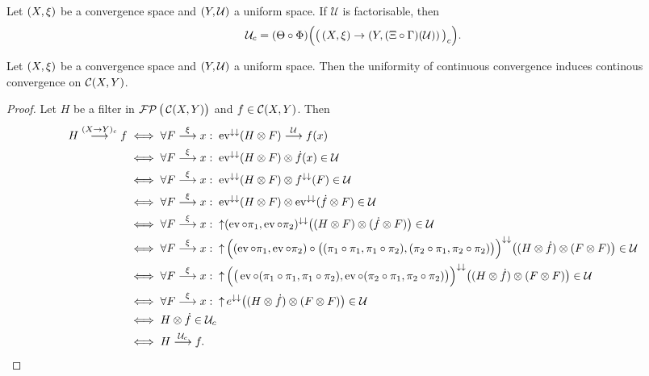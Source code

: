 \begin{lemma}
Let $\left( X, \xi \right)$ be a convergence space and $\left( Y, \mathcal{U} \right)$ a uniform space. If $\mathcal{U}$ is factorisable, then
\[ \mathcal{U}_c = (\Theta\circ\Phi)\Big(\big(\left( X,\xi \right) \to \left( Y, (\Xi\circ\Gamma)(\mathcal{U}) \right)\big)_c\Big). \]
\end{lemma}

\begin{lemma}
Let $\left( X, \xi \right)$ be a convergence space and $\left( Y, \mathcal{U} \right)$ a uniform space. Then the uniformity of continuous convergence induces continous convergence on $\operatorname{\mathcal{C}}(X,Y)$.
\end{lemma}
\begin{proof}
Let $H$ be a filter in $\operatorname{\mathcal{FP}}\big(\operatorname{\mathcal{C}}(X,Y)\big)$ and $f\in \operatorname{\mathcal{C}}(X, Y)$. Then
\begin{align*}
H\overset{(X\to Y)_c}{\longrightarrow} f &\iff \forall F\overset{\xi}{\longrightarrow}x: \; \operatorname{ev}^{\downarrow\downarrow}(H\otimes F) \overset{\mathcal{U}}{\longrightarrow} f(x) \\
&\iff \forall F\overset{\xi}{\longrightarrow}x: \; \operatorname{ev}^{\downarrow\downarrow}(H\otimes F)\otimes \dot{f}(x) \in\mathcal{U} \\
&\iff \forall F\overset{\xi}{\longrightarrow}x: \; \operatorname{ev}^{\downarrow\downarrow}(H\otimes F)\otimes f^{\downarrow\downarrow}(F) \in\mathcal{U} \\
&\iff \forall F\overset{\xi}{\longrightarrow}x: \; \operatorname{ev}^{\downarrow\downarrow}(H\otimes F)\otimes \operatorname{ev}^{\downarrow\downarrow}(\dot{f}\otimes F) \in\mathcal{U} \\
&\iff \forall F\overset{\xi}{\longrightarrow}x: \; \operatorname{\uparrow}(\operatorname{ev}\circ \pi_1, \operatorname{ev}\circ\pi_2)^{\downarrow\downarrow}\big((H\otimes F)\otimes(\dot{f}\otimes F)\big) \in\mathcal{U} \\
&\iff \forall F\overset{\xi}{\longrightarrow}x: \; \operatorname{\uparrow}\Big((\operatorname{ev}\circ \pi_1, \operatorname{ev}\circ\pi_2)\circ \big((\pi_1\circ\pi_1, \pi_1\circ\pi_2),(\pi_2\circ\pi_1, \pi_2\circ\pi_2)\big)\Big)^{\downarrow\downarrow}\big((H\otimes \dot{f})\otimes(F\otimes F)\big) \in\mathcal{U} \\
&\iff \forall F\overset{\xi}{\longrightarrow}x: \; \operatorname{\uparrow}\Big(\big(\operatorname{ev}\circ (\pi_1\circ\pi_1, \pi_1\circ\pi_2), \operatorname{ev}\circ(\pi_2\circ\pi_1, \pi_2\circ\pi_2)\big)\Big)^{\downarrow\downarrow}\big((H\otimes \dot{f})\otimes(F\otimes F)\big) \in\mathcal{U} \\
&\iff \forall F\overset{\xi}{\longrightarrow}x: \; \operatorname{\uparrow} e^{\downarrow\downarrow}\big((H\otimes \dot{f})\otimes(F\otimes F)\big) \in\mathcal{U} \\
&\iff H\otimes \dot{f}\in \mathcal{U}_c \\
&\iff H\overset{\mathcal{U}_c}{\longrightarrow} f.
\end{align*}
\end{proof}


